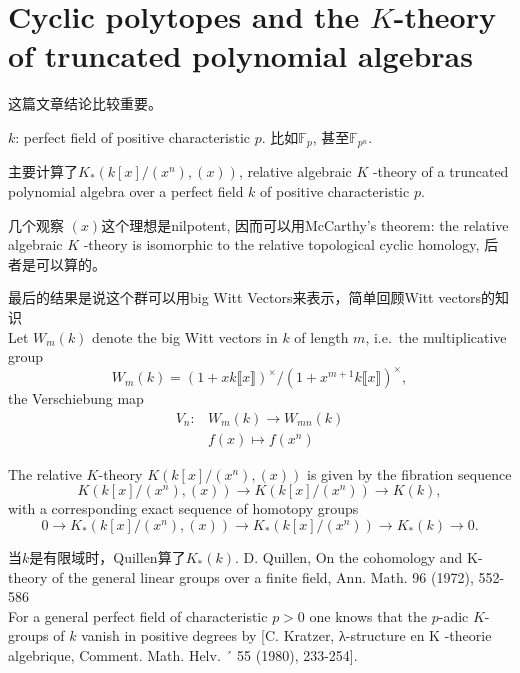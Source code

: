 \section{Cyclic polytopes and the $K$-theory of truncated polynomial algebras} %
\label{sec:cyclic_polytopes_and_the_k_theory_of_truncated_polynomial_algebras}

这篇文章结论比较重要。

$k$: perfect field of positive characteristic $p$. 比如$\mathbb{F}_p$, 甚至$\mathbb{F}_{p^n}$.

主要计算了$K_*(k[x]/(x^n),(x))$,  relative algebraic $K$ -theory of a truncated polynomial algebra over a perfect field $k$ of positive characteristic $p$.

几个观察 $(x)$这个理想是nilpotent, 因而可以用McCarthy's theorem: {\color{green}  the relative algebraic $K$ -theory is isomorphic to the relative topological cyclic homology}, 后者是可以算的。

最后的结果是说这个群可以用big Witt Vectors来表示，简单回顾Witt vectors的知识\\
Let $W_m(k)$ denote
the big Witt vectors in $k$ of length $m$, i.e.\ the multiplicative group
\[W_m(k) = (1 + xk\llbracket x\rrbracket )^{\times}/(1 + x^{m+1}k\llbracket x\rrbracket )^{\times},\]
the Verschiebung map
\begin{align*}
V_n \colon & W_m(k) \longrightarrow W_{mn}(k)\\
& f(x)\mapsto f(x^n)
\end{align*}

The relative $K$-theory $K (k[x]/(x^n),(x))$ is given by the fibration sequence
\[K (k[x]/(x^n), (x)) \longrightarrow K (k[x]/(x^n)) \longrightarrow K (k),\]
with a corresponding exact sequence of homotopy groups
\[0\longrightarrow K_*(k[x]/(x^n), (x)) \longrightarrow K_*(k[x]/(x^n)) \longrightarrow K_*(k)\longrightarrow 0.\]

当$k$是有限域时，Quillen算了$K_*(k)$. D. Quillen, On the cohomology and K-theory of the general linear groups over a finite
field, Ann. Math. 96 (1972), 552-586\\
For a general perfect field of characteristic $p > 0$ one knows that the $p$-adic $K$-groups of $k$ vanish in positive degrees by [C. Kratzer, λ-structure en K -theorie algebrique, Comment. Math. Helv. ´ 55 (1980), 233-254].

